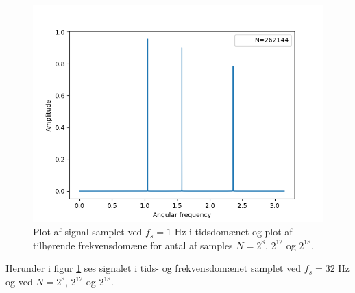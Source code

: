 \begin{figure}[H]
\begin{minipage}{0.49\textwidth}
\includegraphics[width=\textwidth]{figures/frekvensanalyse/1hz_freq3.png}
\end{minipage}
\caption{Plot af signal samplet ved $f_s=1$ Hz i tidsdomænet og plot af tilhørende frekvensdomæne for antal af samples $N=2^8$, $2^{12}$ og $2^{18}$.}
\label{fig:1}
\end{figure}
Herunder i figur \ref{fig:1} ses signalet i tids- og frekvensdomænet samplet ved $f_s=32$ Hz og ved $N=2^8$, $2^{12}$ og $2^{18}$.
